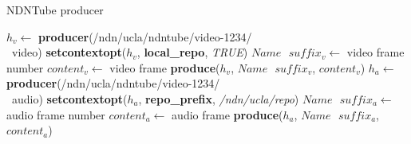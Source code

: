 \begin{algorithm}%
\caption{NDNTube producer}
\label{alg:recordproducer}
\begin{algorithmic}[3]
\State $h_v \leftarrow $ \textbf{producer}(/ndn/ucla/ndntube/video-1234/ \\\ video)
\State \textbf{setcontextopt}($h_v$, \textbf{local\_repo}, \textit{TRUE})
\vspace{0.2cm}
	\State $Name \textbf{ } suffix_v \leftarrow $ video frame number
	\State $content_v \leftarrow $ video frame
	\State \textbf{produce}($h_v$, $Name\textbf{ }suffix_v$, $content_v$)
	\EndWhile
\vspace{0.2cm}
\vspace{0.2cm}
\State $h_a \leftarrow $ \textbf{producer}(/ndn/ucla/ndntube/video-1234/ \\\ audio)
\State \textbf{setcontextopt}($h_a$, \textbf{repo\_prefix}, \textit{/ndn/ucla/repo})
\vspace{0.2cm}
	\State $Name \textbf{ } suffix_a \leftarrow $ audio frame number
	\State $content_a \leftarrow $ audio frame
	\State \textbf{produce}($h_a$, $Name\textbf{ }suffix_a$, $content_a$)
	\EndWhile
\end{algorithmic}
\end{algorithm}

